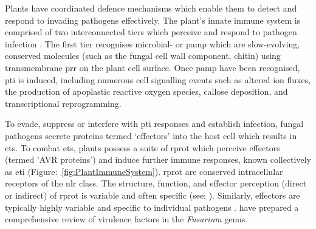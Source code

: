 Plants have coordinated defence mechanisms which enable them to detect and respond to invading pathogens effectively. The plant’s innate immune system is comprised of two interconnected tiers which perceive and respond to pathogen infection \parencite{Jones2006, Han2019, DeFalco2021}. The first tier recognises microbial- or \ac{pamp} which are slow-evolving, conserved molecules (such as the fungal cell wall component, chitin) using transmembrane \ac{prr} on the plant cell surface. Once \ac{pamp} have been recognised, \ac{pti} is induced, including numerous cell signalling events such as altered ion fluxes, the production of apoplastic reactive oxygen species, callose deposition, and transcriptional reprogramming. 

To evade, suppress or interfere with \ac{pti} responses and establish infection, fungal pathogens secrete proteins termed ‘effectors’ into the host cell which results in \ac{ets}. To combat \ac{ets}, plants possess a suite of \ac{rprot} which perceive effectors (termed '\ac{AVR} proteins') and induce further immune responses, known collectively as \ac{eti} \parencite{Jones2006} (Figure:~\ref{fig:PlantImmuneSystem}). \Ac{rprot} are conserved intracellular receptors of the \ac{nlr} class. The structure, function, and effector perception (direct or indirect) of \ac{rprot} is variable and often specific (see: \textcite{Chen2022, Wang2022}). Similarly, effectors are typically highly variable and specific to individual pathogens \parencite{LoPresti2015}. \textcite{Gutierrez2023} have prepared a comprehensive review of virulence factors in the \textit{Fusarium} genus. 

